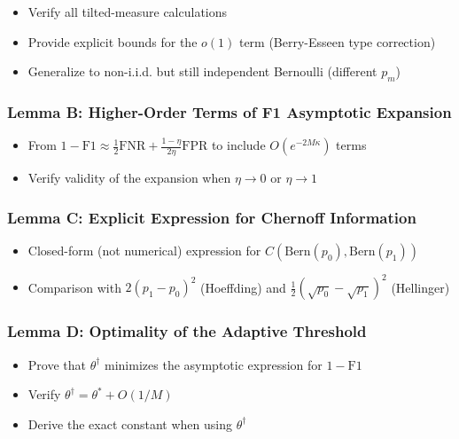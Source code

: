 \documentclass[
  12pt,
]{ctexart}
\providecommand{\tightlist}{%
  \setlength{\itemsep}{0pt}\setlength{\parskip}{0pt}}
\begin{document}
\begin{itemize}
\tightlist
\item
  Verify all tilted-measure calculations
\item
  Provide explicit bounds for the \(o(1)\) term (Berry-Esseen type correction)
\item
  Generalize to non-i.i.d. but still independent Bernoulli (different \(p_m\))
\end{itemize}

\subsubsection{Lemma B: Higher-Order Terms of F1 Asymptotic Expansion}\label{lemma-b-higher-order-terms-of-f1-asymptotic-expansion}

\begin{itemize}
\tightlist
\item
  From \(1-\text{F1} \approx \frac{1}{2}\text{FNR} + \frac{1-\eta}{2\eta}\text{FPR}\) to include \(O(e^{-2M\kappa})\) terms
\item
  Verify validity of the expansion when \(\eta \to 0\) or \(\eta \to 1\)
\end{itemize}

\subsubsection{Lemma C: Explicit Expression for Chernoff Information}\label{lemma-c-explicit-expression-for-chernoff-information}

\begin{itemize}
\tightlist
\item
  Closed-form (not numerical) expression for \(C(\text{Bern}(p_0), \text{Bern}(p_1))\)
\item
  Comparison with \(2(p_1-p_0)^2\) (Hoeffding) and \(\frac{1}{2}(\sqrt{p_0} - \sqrt{p_1})^2\) (Hellinger)
\end{itemize}

\subsubsection{Lemma D: Optimality of the Adaptive Threshold}\label{lemma-d-optimality-of-the-adaptive-threshold}

\begin{itemize}
\tightlist
\item
  Prove that \(\theta^\dagger\) minimizes the asymptotic expression for \(1-\text{F1}\)
\item
  Verify \(\theta^\dagger = \theta^* + O(1/M)\)
\item
  Derive the exact constant when using \(\theta^\dagger\)
\end{itemize}
\end{document}
